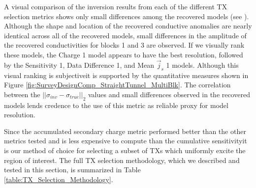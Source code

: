 \documentclass[preprint,authoryear,12pt]{elsarticle}
\providecommand{\DIFaddtex}[1]{{\protect\color{blue}\uwave{#1}}} %
\providecommand{\DIFaddbegin}{} %
\providecommand{\DIFaddend}{} %
\providecommand{\DIFadd}[1]{\texorpdfstring{\DIFaddtex{#1}}{#1}} %
\begin{document}
A visual comparison of the inversion results from each of the different TX selection metrics shows only small differences among the recovered models (see \citet{Mitchell2020}). Although the shape and location of the recovered conductive anomalies are nearly identical across all of the recovered models, small differences in the amplitude of the recovered conductivities for blocks 1 and 3 are observed. If we visually rank these models, the Charge 1 model appears to have the best resolution, followed by the Sensitivity 1, Data Difference 1, and Mean $\vec{j}_s$ 1 models. Although this visual ranking is subjective\DIFaddbegin \DIFadd{, }\DIFaddend it is supported by the quantitative measures shown in Figure \ref{fig:SurveyDesignComp_StraightTunnel_MultiBlk}. The correlation between the $\left|| \sigma_{inv} - \sigma_{true} \right||_2$ values and small differences observed in the recovered models lends credence to the use of this metric as reliable proxy for model resolution.

Since the accumulated secondary charge metric performed better than the other metrics tested and is less expensive to compute than the cumulative sensitivity\DIFaddbegin \DIFadd{, }\DIFaddend it is our method of choice for selecting a subset of TXs which uniformly excite the region of interest. The full TX selection methodology, which we described and tested in this section, is summarized in Table \ref{table:TX_Selection_Methodology}.
\end{document}
